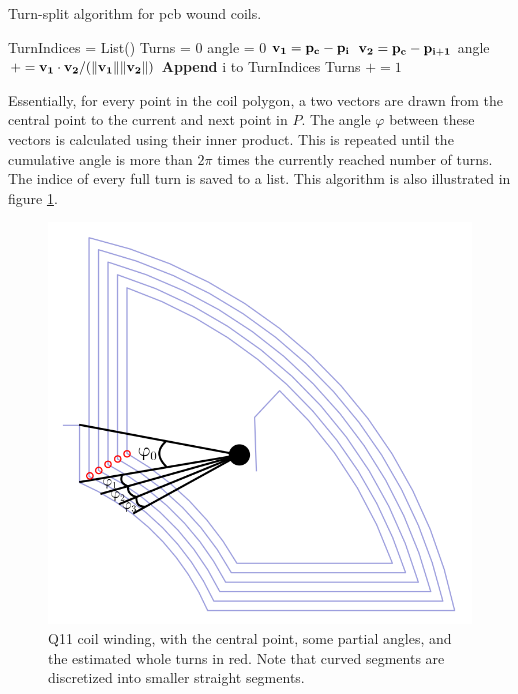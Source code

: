\begin{algorithm}
    \caption{Turn-split algorithm for pcb wound coils.}
    \label{alg:turnsplit}
    \begin{algorithmic}
        \State TurnIndices = List()
        \State Turns = 0
        \State angle = 0
        \State $\vb{v_1} = \vb{p_c} - \vb{p_i}$
        \State $\vb{v_2} = \vb{p_c} - \vb{p_{i+1}}$
        \State angle $+= \vb{v_1}\cdot\vb{v_2}
            /(\|\vb{v_1}\|\|\vb{v_2}\|)$
        \State \textbf{Append} i to TurnIndices
        \State Turns $+= 1$
        \EndIf
        \EndFor
    \end{algorithmic}
\end{algorithm}

Essentially, for every point in the coil polygon, a two vectors
are drawn from the central point to the current and next point
in $P$. The angle $\varphi$ between these vectors is calculated using their
inner product. This is repeated until the cumulative angle is more
than $2\pi$ times the currently reached number of turns. The indice
of every full turn is saved to a list. This algorithm is also illustrated
in figure \ref{fig:Q11-winding}.

\begin{figure}[!h]
    \centering
    \includegraphics[width=0.8\linewidth]{figs/Q11-roundwalk}
    \caption{Q11 coil winding, with the central point, some
        partial angles, and the estimated whole turns in red.
        Note that curved segments are discretized into smaller
        straight segments.}
    \label{fig:Q11-winding}
\end{figure}

